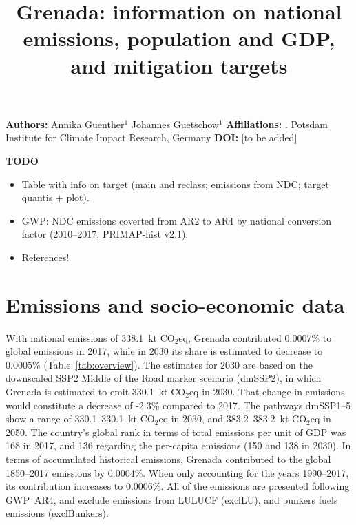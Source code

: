 \documentclass[12pt]{article}
\title{ \bfseries \color{PIKorange} Grenada: information on national emissions, population and GDP, and mitigation targets}
\begin{document}
 \maketitle

 \noindent \textbf{Authors:} \newline
 \indent Annika Guenther$^{1}$ \newline
 \indent Johannes Guetschow$^{1}$ \newline
 \noindent \textbf{Affiliations:} \newline
 . Potsdam Institute for Climate Impact Research, Germany \newline
 \noindent \textbf{DOI:} [to be added] \newline

 \textbf{TODO}
 \begin{itemize}
 \item Table with info on target (main and reclass; emissions from NDC; target quantis + plot).
 \item GWP: NDC emissions coverted from AR2 to AR4 by national conversion factor (2010--2017, PRIMAP-hist v2.1).
 \item References!
 \end{itemize}

 \newpage %
 \section{Emissions and socio-economic data}
 \label{sec:nonLULUCFSocioEco}
 With national emissions of 338.1~kt CO$_2$eq, Grenada contributed 0.0007\% to global emissions in 2017, while in 2030 its share is estimated to decrease to 0.0005\% (Table~\ref{tab:overview}).
 The estimates for 2030 are based on the downscaled SSP2 Middle of the Road marker scenario (dmSSP2), in which Grenada is estimated to emit 330.1~kt CO$_2$eq in 2030.
 That change in emissions would constitute a decrease of -2.3\% compared to 2017. 
 The pathways dmSSP1--5 show a range of 330.1--330.1~kt CO$_2$eq in 2030, and 383.2--383.2~kt CO$_2$eq in 2050.
 The country's global rank in terms of total emissions per unit of GDP was 168 in 2017, and 136 regarding the per-capita emissions (150 and 138 in 2030).
 In terms of accumulated historical emissions, Grenada contributed to the global 1850--2017 emissions by 0.0004\%. 
 When only accounting for the years 1990--2017, its contribution increases to 0.0006\%.
 All of the emissions are presented following GWP~AR4, and exclude emissions from LULUCF (exclLU), and bunkers fuels emissions (exclBunkers).
\end{document}
